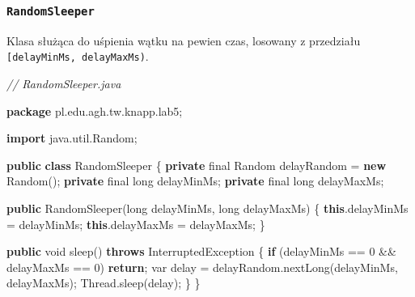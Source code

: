 \documentclass[11pt]{article}
\newenvironment{Shaded}{}{}
\newcommand{\KeywordTok}[1]{\textcolor[rgb]{0.00,0.44,0.13}{\textbf{{#1}}}}
\newcommand{\DataTypeTok}[1]{\textcolor[rgb]{0.56,0.13,0.00}{{#1}}}
\newcommand{\DecValTok}[1]{\textcolor[rgb]{0.25,0.63,0.44}{{#1}}}
\newcommand{\CommentTok}[1]{\textcolor[rgb]{0.38,0.63,0.69}{\textit{{#1}}}}
\newcommand{\FunctionTok}[1]{\textcolor[rgb]{0.02,0.16,0.49}{{#1}}}
\newcommand{\NormalTok}[1]{{#1}}
\newcommand{\ImportTok}[1]{{#1}}
\newcommand{\ControlFlowTok}[1]{\textcolor[rgb]{0.00,0.44,0.13}{\textbf{{#1}}}}
\newcommand{\OperatorTok}[1]{\textcolor[rgb]{0.40,0.40,0.40}{{#1}}}
\newcommand{\BuiltInTok}[1]{{#1}}
\begin{document}
    \hypertarget{randomsleeper}{%
\subsubsection{\texorpdfstring{\texttt{RandomSleeper}}{RandomSleeper}}\label{randomsleeper}}

Klasa służąca do uśpienia wątku na pewien czas, losowany z przedziału
\texttt{{[}delayMinMs,\ delayMaxMs)}.

\begin{Shaded}
\begin{Highlighting}[]
\CommentTok{// RandomSleeper.java}

\KeywordTok{package}\ImportTok{ pl}\OperatorTok{.}\ImportTok{edu}\OperatorTok{.}\ImportTok{agh}\OperatorTok{.}\ImportTok{tw}\OperatorTok{.}\ImportTok{knapp}\OperatorTok{.}\ImportTok{lab5}\OperatorTok{;}

\KeywordTok{import} \ImportTok{java}\OperatorTok{.}\ImportTok{util}\OperatorTok{.}\ImportTok{Random}\OperatorTok{;}

\KeywordTok{public} \KeywordTok{class}\NormalTok{ RandomSleeper }\OperatorTok{\{}
    \KeywordTok{private} \DataTypeTok{final} \BuiltInTok{Random}\NormalTok{ delayRandom }\OperatorTok{=} \KeywordTok{new} \BuiltInTok{Random}\OperatorTok{();}
    \KeywordTok{private} \DataTypeTok{final} \DataTypeTok{long}\NormalTok{ delayMinMs}\OperatorTok{;}
    \KeywordTok{private} \DataTypeTok{final} \DataTypeTok{long}\NormalTok{ delayMaxMs}\OperatorTok{;}

    \KeywordTok{public} \FunctionTok{RandomSleeper}\OperatorTok{(}\DataTypeTok{long}\NormalTok{ delayMinMs}\OperatorTok{,} \DataTypeTok{long}\NormalTok{ delayMaxMs}\OperatorTok{)} \OperatorTok{\{}
        \KeywordTok{this}\OperatorTok{.}\FunctionTok{delayMinMs} \OperatorTok{=}\NormalTok{ delayMinMs}\OperatorTok{;}
        \KeywordTok{this}\OperatorTok{.}\FunctionTok{delayMaxMs} \OperatorTok{=}\NormalTok{ delayMaxMs}\OperatorTok{;}
    \OperatorTok{\}}

    \KeywordTok{public} \DataTypeTok{void} \FunctionTok{sleep}\OperatorTok{()} \KeywordTok{throws} \BuiltInTok{InterruptedException} \OperatorTok{\{}
        \ControlFlowTok{if} \OperatorTok{(}\NormalTok{delayMinMs }\OperatorTok{==} \DecValTok{0} \OperatorTok{\&\&}\NormalTok{ delayMaxMs }\OperatorTok{==} \DecValTok{0}\OperatorTok{)}
            \ControlFlowTok{return}\OperatorTok{;}
        \DataTypeTok{var}\NormalTok{ delay }\OperatorTok{=}\NormalTok{ delayRandom}\OperatorTok{.}\FunctionTok{nextLong}\OperatorTok{(}\NormalTok{delayMinMs}\OperatorTok{,}\NormalTok{ delayMaxMs}\OperatorTok{);}
        \BuiltInTok{Thread}\OperatorTok{.}\FunctionTok{sleep}\OperatorTok{(}\NormalTok{delay}\OperatorTok{);}
    \OperatorTok{\}}
\OperatorTok{\}}
\end{Highlighting}
\end{Shaded}
\end{document}
